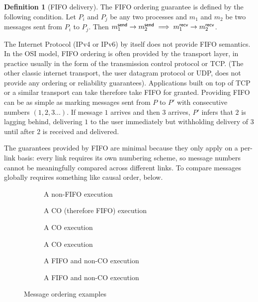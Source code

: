 \documentclass[]             %
{NASA}                       %
\theoremstyle{definition}
\newtheorem{definition}[theorem]{Definition}
\begin{document}
\begin{definition}[FIFO delivery]
  \label{def:fifo}
  The FIFO ordering guarantee is defined by the following condition. Let
  $P_i$ and $P_j$ be any two processes and $m_1$ and $m_2$ be two
  messages sent from $P_i$ to $P_j$. Then
  $m_{1}^{\mathsf{send}} \to m_{2}^{\mathsf{send}} \implies m_{1}^{\mathsf{recv}} \to m_{2}^{\mathsf{recv}}$.
\end{definition}

The Internet Protocol (IPv4 or IPv6) by itself does not provide FIFO
semantics. In the OSI model, FIFO ordering is often provided by the
transport layer, in practice usually in the form of the transmission
control protocol or TCP. (The other classic internet transport, the
user datagram protocol or UDP, does not provide any ordering or
reliability guarantees). Applications built on top of TCP or a similar
transport can take therefore take FIFO for granted. Providing FIFO can
be as simple as marking messages sent from $P$ to $P'$ with
consecutive numbers $(1,2,3\ldots)$. If message $1$ arrives and then
$3$ arrives, $P'$ infers that $2$ is lagging behind, delivering $1$ to
the user immediately but withholding delivery of $3$ until after $2$
is received and delivered.

The guarantees provided by FIFO are minimal because they only apply on
a per-link basis: every link requires its own numbering scheme, so
message numbers cannot be meaningfully compared across different
links. To compare messages globally requires something like causal
order, below.

\begin{figure}[p]
  \setlength\abovecaptionskip{0ex}
  \setlength\belowcaptionskip{4ex}
  \begin{subfigure}[t]{0.475\textwidth}
    \centering
    
    \caption{A non-FIFO execution}
    \label{fig:ordex-non-fifo}
  \end{subfigure}
  \begin{subfigure}[t]{0.475\textwidth}
  \centering
  
  \caption{A CO (therefore FIFO) execution}
  \label{fig:ordex-co-1}
\end{subfigure}
\begin{subfigure}[b]{0.475\textwidth}
  \centering
  
  \caption{A CO execution}
  \label{fig:ordex-co-2}
\end{subfigure}
\begin{subfigure}[b]{0.475\textwidth}
  \centering
  
  \caption{A CO execution}
  \label{fig:ordex-co-3}
\end{subfigure}
\begin{subfigure}[b]{0.475\textwidth}
  \centering
  
  \caption{A FIFO and non-CO execution}
  \label{fig:ordex-non-co-1}
\end{subfigure}\hfill
\begin{subfigure}[b]{0.475\textwidth}
  \centering
  
  \caption{A FIFO and non-CO execution}
  \label{fig:ordex-non-co-2}
\end{subfigure}
\caption{Message ordering examples}
\label{fig:message-ordering}
\end{figure}
\end{document}
